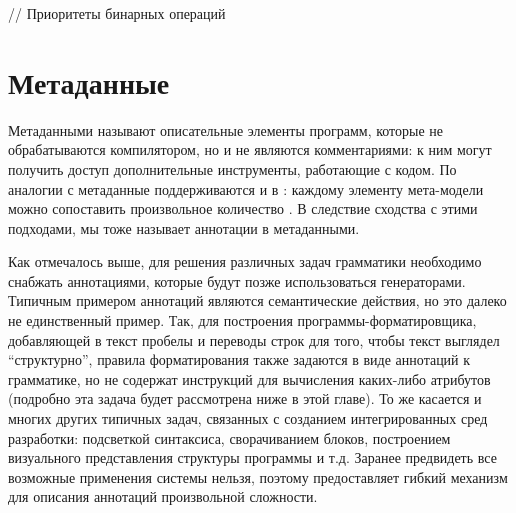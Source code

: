 // Приоритеты бинарных операций

\section{Метаданные}

Метаданными называют описательные элементы программ, которые не обрабатываются компилятором, но и не являются комментариями: к ним могут получить доступ дополнительные инструменты, работающие с кодом. По аналогии с  метаданные поддерживаются и в : каждому элементу мета-модели можно сопоставить произвольное количество . В следствие сходства с этими подходами, мы тоже называет аннотации в  метаданными.

Как отмечалось выше, для решения различных задач грамматики необходимо снабжать аннотациями, которые будут позже использоваться генераторами. Типичным примером аннотаций являются семантические действия, но это далеко не единственный пример. Так, для построения программы-форматировщика, добавляющей в текст пробелы и переводы строк для того, чтобы текст выглядел ``структурно'', правила форматирования также задаются в виде аннотаций к грамматике, но не содержат инструкций для вычисления каких-либо атрибутов (подробно эта задача будет рассмотрена ниже в этой главе). То же касается и многих других типичных задач, связанных с созданием интегрированных сред разработки: подсветкой синтаксиса, сворачиванием блоков, построением визуального представления структуры программы и т.д. Заранее предвидеть все возможные применения системы нельзя, поэтому  предоставляет гибкий механизм для описания аннотаций произвольной сложности.

